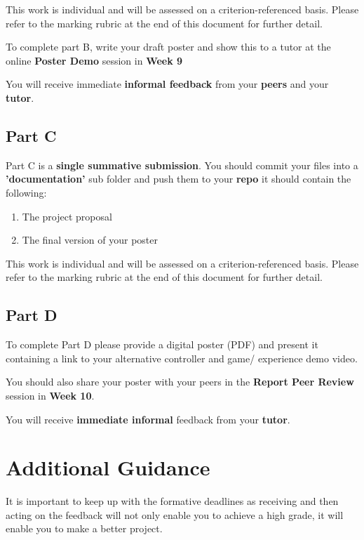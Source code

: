 \documentclass{../../fal_assignment}
\begin{document}
This work is individual and will be assessed on a criterion-referenced basis. Please refer to the marking rubric at the end of this document for further detail.

To complete part B, write your draft poster and show this to a tutor at the online \textbf{Poster Demo} session in \textbf{Week 9}

You will receive immediate \textbf{informal feedback} from your \textbf{peers} and your \textbf{tutor}.

\subsection*{Part C}

Part C is a \textbf{single summative submission}. You should commit your files into a \textbf{ 'documentation'} sub folder and push them to your \textbf{repo} it should contain the following:

	\begin{enumerate}
	\item The project proposal
	\item The final version of your poster
	\end{enumerate}

This work is individual and will be assessed on a criterion-referenced basis. Please refer to the marking rubric at the end of this document for further detail.

\subsection*{Part D}

	To complete Part D please provide a digital poster (PDF) and present it containing a link to your alternative controller and game/ experience demo video.
	
	You should also share your poster with your peers in the \textbf{Report Peer Review} session in \textbf{Week 10}. 

	You will receive \textbf{immediate informal} feedback from your \textbf{tutor}.

\section*{Additional Guidance}
It is important to keep up with the formative deadlines as receiving and then acting on the feedback 
will not only enable you to achieve a high grade, it will enable you to make a better project. 
\end{document}
